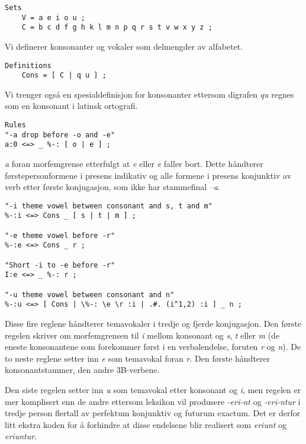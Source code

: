 \documentclass{article}
\let\w\emph
\begin{document}
\begin{lstlisting}[name=verbs-twolc.txt]
Sets
    V = a e i o u ;
    C = b c d f g h k l m n p q r s t v w x y z ;
\end{lstlisting}

Vi definerer konsonanter og vokaler som delmengder av alfabetet.

\begin{lstlisting}[name=verbs-twolc.txt]
Definitions
    Cons = [ C | q u ] ;
\end{lstlisting}

Vi trenger ogs\aa{} en spesialdefinisjon for konsonanter ettersom digrafen
\w{qu} regnes som en konsonant i latinsk ortografi.

\begin{lstlisting}[name=verbs-twolc.txt]
Rules
"-a drop before -o and -e"
a:0 <=> _ %-: [ o | e ] ;
\end{lstlisting}

\w{a} foran morfemgrense etterfulgt at \w{e} eller \w{e} faller bort. Dette
h\aa{}ndterer f\o{}rstepersonformene i presens indikativ og alle formene i
presens konjunktiv av verb etter f\o{}rste konjugasjon, som ikke har
stammefinal \w{--a}.

\begin{lstlisting}[name=verbs-twolc.txt]
"-i theme vowel between consonant and s, t and m"
%-:i <=> Cons _ [ s | t | m ] ;

"-e theme vowel before -r"
%-:e <=> Cons _ r ;

"Short -i to -e before -r"
I:e <=> _ %-: r ;

"-u theme vowel between consonant and n"
%-:u <=> [ Cons | \%-: \e \r :i | .#. (i^1,2) :i ] _ n ;
\end{lstlisting}

Disse fire reglene h\aa{}ndterer temavokaler i tredje og fjerde konjugasjon.
Den f\o{}rste regelen skriver om morfemgrensen til \w{i} mellom konsonant og
\w{s}, \w{t} eller \w{m} (de eneste konsonantene som forekommer f\o{}rst i en
verbalendelse, foruten \w{r} og \w{n}). De to neste reglene setter inn \w{e} som
temavokal foran \w{r}. Den f\o{}rste h\aa{}ndterer konsonantstammer, den andre
3B-verbene.

Den siste regelen setter inn \w{u} som temavokal etter konsonant og \w{i}, men
regelen er mer komplisert enn de andre ettersom leksikon vil produsere
\w{-eri-nt} og \w{-eri-ntur} i tredje person flertall av perfektum konjunktiv
og futurum exactum. Det er derfor litt ekstra koden for \aa{} forhindre at
disse endelsene blir realisert som \w{eriunt} og \w{eriuntur}.
\end{document}

